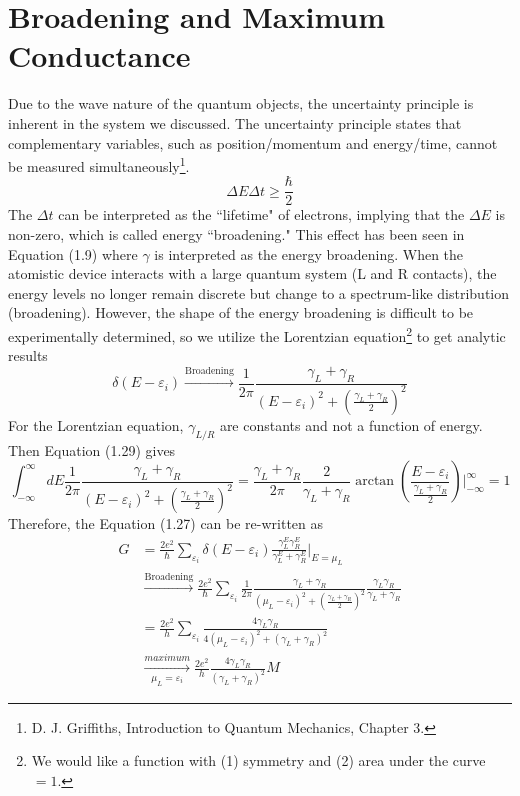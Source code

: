 \section{Broadening and Maximum Conductance}
Due to the wave nature of the quantum objects, the uncertainty principle is inherent in the system we discussed. The uncertainty principle states that complementary variables, such as position/momentum and energy/time, cannot be measured simultaneously\footnote{D. J. Griffiths, Introduction to Quantum Mechanics, Chapter 3.}. 
\begin{equation}
    \Delta E \Delta t \geq \frac{\hbar}{2}
\end{equation} 
The $\Delta t$ can be interpreted as the ``lifetime" of electrons, implying that the $\Delta E$ is non-zero, which is called energy ``broadening." This effect has been seen in Equation (1.9) where $\gamma$ is interpreted as the energy broadening. When the atomistic device interacts with a large quantum system (L and R contacts), the energy levels no longer remain discrete but change to a spectrum-like distribution (broadening). However, the shape of the energy broadening is difficult to be experimentally determined, so we utilize the Lorentzian equation\footnote{We would like a function with (1) symmetry and (2) area under the curve $=1$.} to get analytic results \begin{equation}
    \delta\left(E-\varepsilon_{i}\right) \xrightarrow{\text{Broadening}} \frac{1}{2\pi}\frac{\gamma_{L}+\gamma_{R}}{\left(E-\varepsilon_{i}\right)^{2}+\left(\frac{\gamma_{L}+\gamma_{R}}{2}\right)^{2}}
\end{equation} 
For the Lorentzian equation, $\gamma_{L/R}$ are constants and not a function of energy. Then Equation (1.29) gives 
\begin{equation}
    \int_{-\infty}^{\infty} dE \frac{1}{2\pi}\frac{\gamma_{L}+\gamma_{R}}{\left(E-\varepsilon_{i}\right)^{2}+\left(\frac{\gamma_{L}+\gamma_{R}}{2}\right)^{2}} = \frac{\gamma_{L}+\gamma_{R}}{2\pi}\frac{2}{\gamma_{L}+\gamma_{R}}\arctan\left({\frac{E-\varepsilon_{i}}{\frac{\gamma_{L}+\gamma_{R}}{2}}}\right)\bigg|_{-\infty}^{\infty}=1
\end{equation} 
Therefore, the Equation (1.27) can be re-written as 
\begin{align}
    G& = \frac{2e^{2}}{\hbar}\sum_{\varepsilon_{i}}{\delta\left(E-\varepsilon_{i}\right)} \frac{\gamma^E_{L}\gamma^E_{R}}{\gamma^E_{L}+\gamma^E_{R}}\bigg|_{E=\mu_{L}}\nonumber\\
    &\xrightarrow{\text{Broadening}} \frac{2e^{2}}{\hbar}\sum_{\varepsilon_{i}}{\frac{1}{2\pi}\frac{\gamma_{L}+\gamma_{R}}{\left(\mu_{L}-\varepsilon_{i}\right)^{2}+\left(\frac{\gamma_{L}+\gamma_{R}}{2}\right)^{2}}} \frac{\gamma_{L}\gamma_{R}}{\gamma_{L}+\gamma_{R}}\nonumber\\
    &= \frac{2e^{2}}{h}\sum_{\varepsilon_{i}}{\frac{4\gamma_{L}\gamma_{R}}{4\left(\mu_{L}-\varepsilon_{i}\right)^{2}+\left(\gamma_{L}+\gamma_{R}\right)^{2}}}\nonumber\\
    &\xrightarrow[\mu_{L}=\varepsilon_{i}]{maximum} \frac{2e^{2}}{h}{\frac{4\gamma_{L}\gamma_{R}}{\left(\gamma_{L}+\gamma_{R}\right)^{2}}M}
\end{align} 
